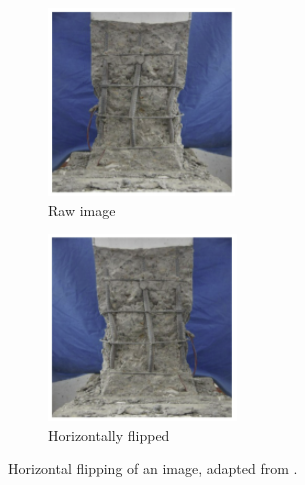 \documentclass[10pt,twocolumn,letterpaper]{article}
\begin{document}
\begin{figure}[!htbp]
  \centering
  \begin{subfigure}[b]{0.4\columnwidth}
    \centering
    \includegraphics[width=\linewidth]{Figures/FlipRaw.png}
    \caption{Raw image}
    \label{fig:short-a}
  \end{subfigure}
  \begin{subfigure}[b]{0.4\columnwidth}
\centering
    \includegraphics[width=\linewidth]{Figures/FlipHoriz.png}
    \caption{Horizontally flipped}
    \label{fig:short-b}
  \end{subfigure}
  \caption{Horizontal flipping of an image, adapted from \cite{Xu22019}.}
  \label{fig:centerloss}
\end{figure}
\end{document}
